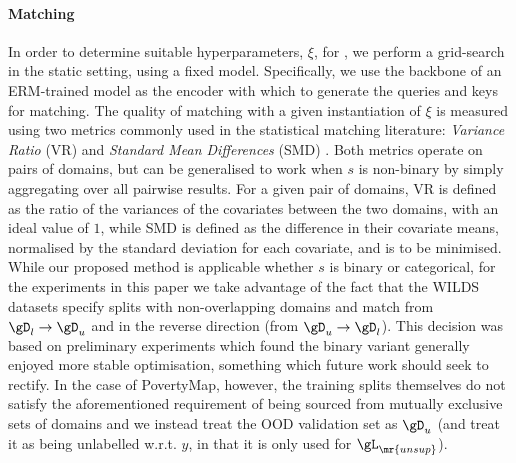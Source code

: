 \paragraph{Matching}\label{matching_imp} In order to determine suitable hyperparameters, $\xi$, for
\CNN, we perform a grid-search in the static setting, using a fixed model. Specifically, we use the
backbone of an ERM-trained model as the encoder with which to generate the queries and keys for
matching.
%
The quality of matching with a given instantiation of $\xi$ is measured using two metrics commonly
used in the statistical matching literature: \emph{Variance Ratio} (VR) and \emph{Standard Mean
Differences} (SMD) \citep{rubin2001using}. 
%
Both metrics operate on pairs of domains, but can be generalised to work when $s$ is non-binary by
simply aggregating over all pairwise results.
%
For a given pair of domains, VR is defined as the ratio of the variances of the covariates between
the two domains, with an ideal value of $1$, while SMD is defined as the difference in their
covariate means, normalised by the standard deviation for each covariate, and is to be minimised.
%
While our proposed method is applicable whether $s$ is binary or categorical, for the experiments
in this paper we take advantage of the fact that the WILDS datasets specify splits with
non-overlapping domains and match from \( \gD_l \rightarrow \gD_u \) and in the reverse direction (from
\( \gD_u \rightarrow \gD_l \)). This decision was based on preliminary experiments which found the binary
variant generally enjoyed more stable optimisation, something which future work should seek to
rectify.
%
In the case of PovertyMap, however, the training splits themselves do not satisfy the
aforementioned requirement of being sourced from mutually exclusive sets of domains and we instead
treat the OOD validation set as \( \gD_u \) (and treat it as being unlabelled w.r.t. $y$, in that it is
only used for \( \gL_\mr{unsup} \)).

